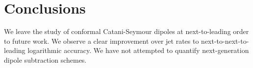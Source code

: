 \section{Conclusions}\label{sec:conclusions}

We leave the study of conformal Catani-Seymour dipoles at
next-to-leading order to future work. We observe a clear improvement
over jet rates to next-to-next-to-leading logarithmic accuracy. We have
not attempted to quantify next-generation dipole subtraction schemes.

